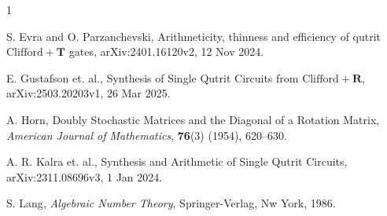 \documentclass[12pt]{amsart}
\theoremstyle{definition}
\newcommand{\bR}{\mathbf{R}}
\begin{document}
	\begin{thebibliography}{1}
		
		 {\sc S. Evra and O. Parzanchevski}, Arithmeticity, thinness and efficiency
		of qutrit $\mbox{Clifford}+\mathbf{T}$ gates, arXiv:2401.16120v2, 12 Nov 2024.
		
		  {\sc E. Gustafson et. al.}, Synthesis of Single Qutrit Circuits from $\mbox{Clifford}+\bR$, arXiv:2503.20203v1, 26 Mar 2025.
		
		 {\sc A. Horn}, Doubly Stochastic Matrices and the Diagonal of a Rotation Matrix, \emph{American Journal of Mathematics}, \textbf{76}(3) (1954), 620--630.
				
		 {\sc A. R. Kalra et. al.}, Synthesis and Arithmetic of Single Qutrit Circuits, arXiv:2311.08696v3, 1 Jan 2024.
		
		 {\sc S. Lang}, \emph{Algebraic Number Theory}, Springer-Verlag, Nw York, 1986.
		
		
		
	\end{thebibliography} 
	
\end{document}
